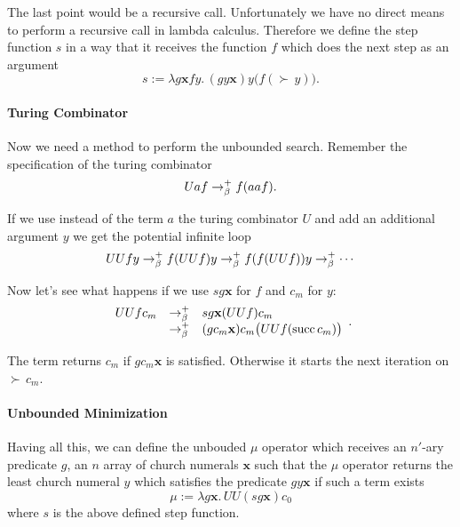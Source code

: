 The last point would be a recursive call. Unfortunately we have no direct
means to perform a recursive call in lambda calculus. Therefore we define the
step function $s$ in a way that it receives the function $f$ which does the
next step as an argument
$$ s := \lambda g \mathbf{x} f y.\, (gy\mathbf{x}) y \big(f (\succ\, y)\big).$$


\paragraph{Turing Combinator} Now we need a method to perform the unbounded
search. Remember the specification of the turing combinator
$$ U a f \to^+_\beta f (a a f).$$

If we use instead of the term $a$ the turing combinator $U$ and add an
additional argument $y$ we get the
potential infinite loop
$$ U U f y\to^+_\beta f (U U f) y \to^+_\beta f (f (U U f)) y \to^+_\beta
\cdots $$

Now let's see what happens if we use $s g \mathbf{x}$ for $f$  and $c_m$ for $y$:
$$
\begin{array}{lll}
  U U f c_m  &\to^+_\beta & s g\mathbf{x} (U U f) c_m\\
  &\to^+_\beta&  (g c_m \mathbf{x}) c_m \big(U U f (\text{succ}\, c_m)\big)
\end{array}.
$$

The term returns $c_m$ if $g c_m \mathbf{x}$ is satisfied. Otherwise it starts
the next iteration on $\succ\, c_m$.


\paragraph{Unbounded Minimization} Having all this, we can define the unbouded
$\mu $ operator which receives an $n'$-ary predicate $g$, an $n$ array of
church numerals $\mathbf{x}$ such that the $\mu $ operator returns the least
church numeral $y$ which satisfies the predicate $g y \mathbf{x}$ if such a
term exists
$$ \mu := \lambda g \mathbf{x}.\, U U (s g \mathbf{x}) c_0$$
where $s$ is the above defined step function.
